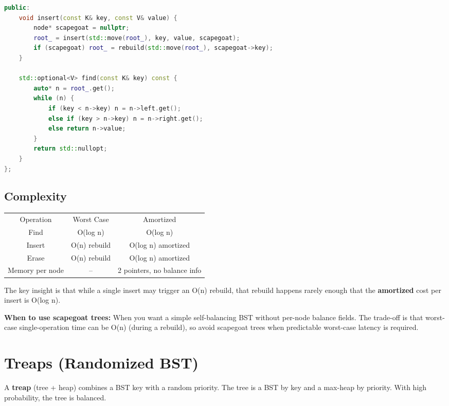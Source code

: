 \begin{lstlisting}[language=C++]
public:
    void insert(const K& key, const V& value) {
        node* scapegoat = nullptr;
        root_ = insert(std::move(root_), key, value, scapegoat);
        if (scapegoat) root_ = rebuild(std::move(root_), scapegoat->key);
    }

    std::optional<V> find(const K& key) const {
        auto* n = root_.get();
        while (n) {
            if (key < n->key) n = n->left.get();
            else if (key > n->key) n = n->right.get();
            else return n->value;
        }
        return std::nullopt;
    }
};
\end{lstlisting}

\subsection{Complexity}

\begin{center}
\begin{tabular}{ccc}
\toprule
Operation & Worst Case & Amortized \\
Find & O(log n) & O(log n) \\
Insert & O(n) rebuild & O(log n) amortized \\
Erase & O(n) rebuild & O(log n) amortized \\
\midrule
Memory per node & -- & 2 pointers, no balance info \\
\bottomrule
\end{tabular}
\end{center}

The key insight is that while a single insert may trigger an O(n) rebuild, that rebuild happens rarely enough that the \textbf{amortized} cost per insert is O(log n).

\textbf{When to use scapegoat trees:} When you want a simple self-balancing BST without per-node balance fields. The trade-off is that worst-case single-operation time can be O(n) (during a rebuild), so avoid scapegoat trees when predictable worst-case latency is required.

\section{Treaps (Randomized BST)}

A \textbf{treap} (tree + heap) combines a BST key with a random priority. The tree is a BST by key and a max-heap by priority. With high probability, the tree is balanced.


